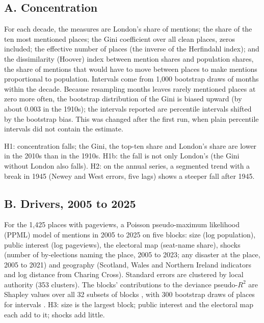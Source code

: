 \documentclass[11pt,a4paper]{article}
\begin{document}
\subsection{A. Concentration}
For each decade, the measures are London's share of mentions; the share of the ten most mentioned places; the Gini coefficient over all clean places, zeros included; the effective number of places (the inverse of the Herfindahl index); and the dissimilarity (Hoover) index between mention shares and population shares, the share of mentions that would have to move between places to make mentions proportional to population. Intervals come from 1,000 bootstrap draws of months within the decade. Because resampling months leaves rarely mentioned places at zero more often, the bootstrap distribution of the Gini is biased upward (by about 0.003 in the 1910s); the intervals reported are percentile intervals shifted by the bootstrap bias. This was changed after the first run, when plain percentile intervals did not contain the estimate.

H1: concentration falls; the Gini, the top-ten share and London's share are lower in the 2010s than in the 1910s. H1b: the fall is not only London's (the Gini without London also falls). H2: on the annual series, a segmented trend with a break in 1945 (Newey and West errors, five lags) shows a steeper fall after 1945.

\subsection{B. Drivers, 2005 to 2025}
For the 1,425 places with pageviews, a Poisson pseudo-maximum likelihood (PPML) model \citep{santossilva2006} of mentions in 2005 to 2025 on five blocks: size (log population), public interest (log pageviews), the electoral map (seat-name share), shocks (number of by-elections naming the place, 2005 to 2023; any disaster at the place, 2005 to 2021) and geography (Scotland, Wales and Northern Ireland indicators and log distance from Charing Cross). Standard errors are clustered by local authority (353 clusters). The blocks' contributions to the deviance pseudo-$R^2$ are Shapley values over all 32 subsets of blocks \citep{israeli2007}, with 300 bootstrap draws of places for intervals \citep{efron1993}. H3: size is the largest block; public interest and the electoral map each add to it; shocks add little.
\end{document}

